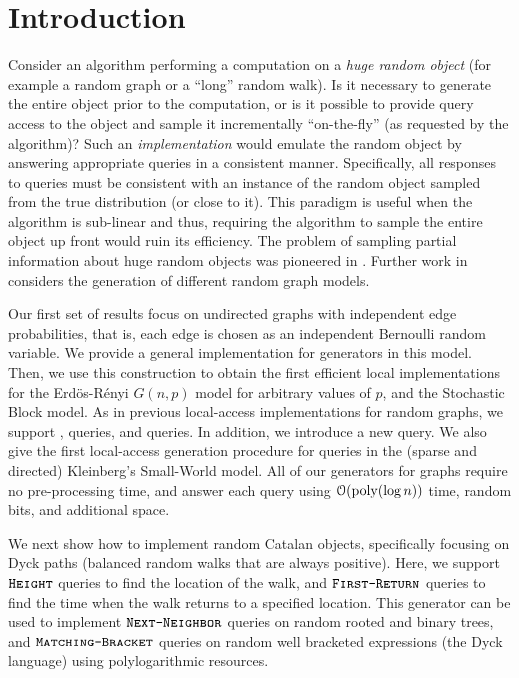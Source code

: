 \section{Introduction}
Consider an algorithm performing a computation on a \emph{huge random object} (for example a random graph or a ``long'' random walk).
Is it necessary to generate the entire object prior to the computation,
or is it possible to provide query access to the object and sample it incrementally ``on-the-fly'' (as requested by the algorithm)?
Such an \emph{implementation} would emulate the random object by answering appropriate queries in a consistent manner.
Specifically, all responses to queries must be consistent with an instance of the random object sampled from the true distribution (or close to it).
This paradigm is useful when the algorithm is sub-linear and thus,
requiring the algorithm to sample the entire object up front would ruin its efficiency.
The problem of sampling partial information about huge random objects was pioneered in \cite{huge_old,huge}.
Further work in \cite{sparse,reut} considers the generation of different random graph models.

Our first set of results focus on undirected graphs with independent edge probabilities,
that is, each edge is chosen as an independent Bernoulli random variable.
We provide a general implementation for generators in this model.
Then, we use this construction to obtain the first efficient local implementations for the Erd\"{o}s-R\'{e}nyi $G(n,p)$ model
for arbitrary values of $p$, and the Stochastic Block model.
As in previous local-access implementations for random graphs,
we support ,  queries, and  queries.
In addition, we introduce a new  query.
We also give the first local-access generation procedure for  queries in the (sparse and directed) Kleinberg's Small-World model.
All of our generators for graphs require no pre-processing time,
and answer each query using $ \mathcal{O}(\mathrm{poly}(\log n)) $ time, random bits, and additional space.

We next show how to implement random Catalan objects, specifically focusing on Dyck paths (balanced random walks that are always positive).
Here, we support $\texttt{\textsc{Height}}$ queries to find the location of the walk,
and $\texttt{\textsc{First-Return}}$ queries to find the time when the walk returns to a specified location.
This generator can be used to implement $\texttt{\textsc{Next-Neighbor}}$ queries on random rooted and binary trees,
and $\texttt{\textsc{Matching-Bracket}}$ queries on random well bracketed expressions (the Dyck language) using polylogarithmic resources.

